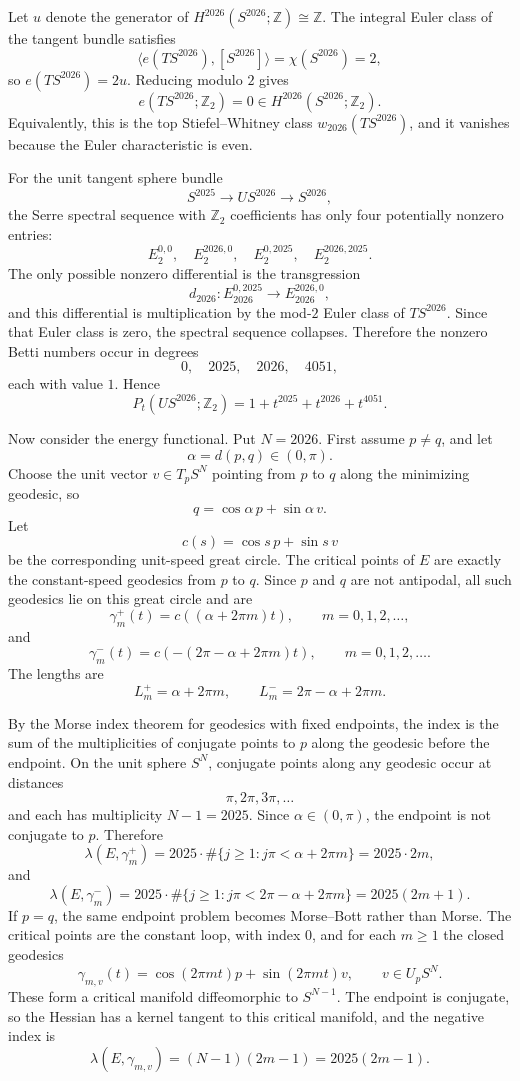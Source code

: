 \begin{solution}
Let $u$ denote the generator of
$H^{2026}(S^{2026};\mathbb{Z})\cong\mathbb{Z}$. The integral Euler class of the
tangent bundle satisfies
\[
    \langle e(TS^{2026}),[S^{2026}]\rangle
    =
    \chi(S^{2026})=2,
\]
so $e(TS^{2026})=2u$. Reducing modulo $2$ gives
\[
    e(TS^{2026};\mathbb{Z}_2)=0
    \in H^{2026}(S^{2026};\mathbb{Z}_2).
\]
Equivalently, this is the top Stiefel--Whitney class
$w_{2026}(TS^{2026})$, and it vanishes because the Euler characteristic is even.

For the unit tangent sphere bundle
\[
    S^{2025}\longrightarrow US^{2026}\longrightarrow S^{2026},
\]
the Serre spectral sequence with $\mathbb{Z}_2$ coefficients has only four
potentially nonzero entries:
\[
    E_2^{0,0},\quad E_2^{2026,0},\quad E_2^{0,2025},\quad E_2^{2026,2025}.
\]
The only possible nonzero differential is the transgression
\[
    d_{2026}:E_{2026}^{0,2025}\longrightarrow E_{2026}^{2026,0},
\]
and this differential is multiplication by the mod-$2$ Euler class of
$TS^{2026}$. Since that Euler class is zero, the spectral sequence collapses.
Therefore the nonzero Betti numbers occur in degrees
\[
    0,\quad 2025,\quad 2026,\quad 4051,
\]
each with value $1$. Hence
\[
    P_t(US^{2026};\mathbb{Z}_2)
    =
    1+t^{2025}+t^{2026}+t^{4051}.
\]

Now consider the energy functional. Put $N=2026$. First assume $p\neq q$, and let
\[
    \alpha=d(p,q)\in(0,\pi).
\]
Choose the unit vector $v\in T_pS^N$ pointing from $p$ to $q$ along the minimizing
geodesic, so
\[
    q=\cos\alpha\,p+\sin\alpha\,v.
\]
Let
\[
    c(s)=\cos s\,p+\sin s\,v
\]
be the corresponding unit-speed great circle. The critical points of $E$ are
exactly the constant-speed geodesics from $p$ to $q$. Since $p$ and $q$ are not
antipodal, all such geodesics lie on this great circle and are
\[
    \gamma_m^+(t)=c((\alpha+2\pi m)t),
    \qquad m=0,1,2,\ldots,
\]
and
\[
    \gamma_m^-(t)=c(-(2\pi-\alpha+2\pi m)t),
    \qquad m=0,1,2,\ldots.
\]
The lengths are
\[
    L_m^+=\alpha+2\pi m,
    \qquad
    L_m^-=2\pi-\alpha+2\pi m.
\]

By the Morse index theorem for geodesics with fixed endpoints, the index is the
sum of the multiplicities of conjugate points to $p$ along the geodesic before the
endpoint. On the unit sphere $S^N$, conjugate points along any geodesic occur at
distances
\[
    \pi,2\pi,3\pi,\ldots
\]
and each has multiplicity $N-1=2025$. Since $\alpha\in(0,\pi)$, the endpoint is not
conjugate to $p$. Therefore
\[
    \lambda(E,\gamma_m^+)
    =
    2025\cdot \#\{j\geq 1:j\pi<\alpha+2\pi m\}
    =
    2025\cdot 2m,
\]
and
\[
    \lambda(E,\gamma_m^-)
    =
    2025\cdot \#\{j\geq 1:j\pi<2\pi-\alpha+2\pi m\}
    =
    2025(2m+1).
\]
If $p=q$, the same endpoint problem becomes Morse--Bott rather than Morse. The
critical points are the constant loop, with index $0$, and for each $m\geq 1$ the
closed geodesics
\[
    \gamma_{m,v}(t)=\cos(2\pi mt)p+\sin(2\pi mt)v,
    \qquad v\in U_pS^N.
\]
These form a critical manifold diffeomorphic to $S^{N-1}$. The endpoint is
conjugate, so the Hessian has a kernel tangent to this critical manifold, and the
negative index is
\[
    \lambda(E,\gamma_{m,v})=(N-1)(2m-1)=2025(2m-1).
\]


\end{solution}
